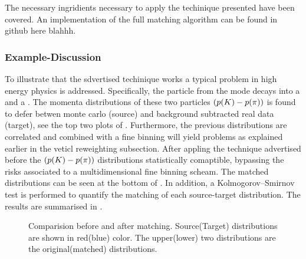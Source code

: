 The necessary ingridients necessary to apply the techinique presented have been covered.
An implementation of the full matching algorithm can be found in github here blahhh.

\subsubsection{Example-Discussion}
To illustrate that the sdvertised techinique works a typical problem in high energy physics is addressed.
Specifically, the \Kstarz particle from the \BsJpsiKst mode decays into a \kaon and a \pion. The momenta
distributions of these two particles $\left( \mbox{$p$}(K)-\mbox{$p$}(\pi) \right)$ is found to defer betwen
monte carlo (source) and background subtracted real data (target), see the top two plots of .
Furthermore, the previous distributions are correlated and combined with a fine binning will yield problems as explained
earlier in the veticl reweighting subsection. After appling the technique advertised before the
$\left( \mbox{$p$}(K)-\mbox{$p$}(\pi) \right)$ distributions statistically comaptible, bypassing the risks associated
to a multidimensional fine binning scheam. The matched distributions can be seen at the bottom of .
In addition, a Kolmogorov–Smirnov test is performed to quantify the matching of each source-target distribution.
The results are summarised in .

\begin{figure}[t]
  \centering
  \begin{subfigure}{0.5\textwidth}
    \raggedright
    \scalebox{1.15}{}
    \caption{}
    \label{kplus_rew_original}
  \end{subfigure}%
  \hfill
  \begin{subfigure}{0.5\textwidth}
    \raggedleft
    \scalebox{1.15}{}
    \caption{}
    \label{pminus_rew_original}
  \end{subfigure}
\begin{subfigure}{0.5\textwidth}
    \raggedright
    \scalebox{1.15}{}
    \caption{}
    \label{kplus_rew_matched}
  \end{subfigure}%
  \hfill
  \begin{subfigure}{0.5\textwidth}
    \raggedleft
    \scalebox{1.15}{}
    \caption{}
    \label{pminus_rew_matched}
  \end{subfigure}
  \caption{Comparision before and after matching. Source(Target) distributions are shown in red(blue) color.
   The upper(lower) two distributions are the original(matched) distributions.}
  \label{hor_rew_example_figs}
\end{figure}

